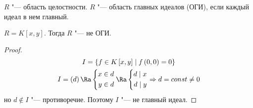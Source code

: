 \begin{Def}
	$R$ "--- область целостности.
	$R$ "--- область главных идеалов (ОГИ), если каждый идеал в нем главный.
\end{Def}

\begin{exmp}
	$R = K[x, y]$. Тогда $R$ "--- не ОГИ.
	\begin{proof}
		\begin{gather*}
			I = \left\{f \in K\left[x,y\right] \mid f\left(0,0\right) = 0\right\} \\
			I = \left(d\right) \Ra
			\left\{\begin{aligned}
				x \in d \\ y \in d
			\end{aligned}\right.
			\Ra
			\left\{\begin{aligned}
				d \mid x \\ d \mid y
			\end{aligned}\right.
			\Rightarrow
				d = const \neq 0
		\end{gather*}
		но $d \notin I$ "--- противоречие. Поэтому $I$ "--- не главный идеал.
	\end{proof}
\end{exmp}
